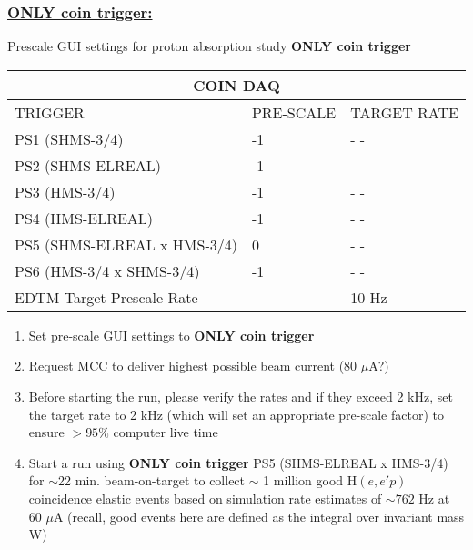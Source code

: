 \documentclass{article}
\begin{document}
\subsubsection*{\underline{ONLY coin trigger:}} 
    \begin{center}
    Prescale GUI settings for proton absorption study \textbf{ONLY coin trigger}
    \begin{tabular}{ |p{6cm}| |p{3cm}| |p{3cm}| }
    \hline
    \multicolumn{3}{|c|}{COIN DAQ} \\
    \hline
    TRIGGER & PRE-SCALE & TARGET RATE\\
    \hline
    PS1 (SHMS-3/4)    & -1  & - - \\
    PS2 (SHMS-ELREAL) &  -1  & - - \\
    PS3 (HMS-3/4)     & -1  & - -\\
    PS4 (HMS-ELREAL)  & -1  & - - \\
    PS5 (SHMS-ELREAL x HMS-3/4)  & 0 & - -  \\
    PS6 (HMS-3/4 x SHMS-3/4)     & -1 & - -  \\
    \hline
    EDTM Target Prescale Rate & - - & 10 Hz \\
    \hline
    \end{tabular}
    \end{center}
\begin{enumerate}
    \item Set pre-scale GUI settings to \textbf{ONLY coin trigger}
    \item Request MCC to deliver highest possible beam current (80 $\mu$A?)
    \item Before starting the run, please verify the rates and if they exceed 2 kHz, set the target rate to 2 kHz (which will set an appropriate pre-scale factor) to ensure $>95\%$ computer live time
    \item Start a run using \textbf{ONLY coin trigger} PS5 (SHMS-ELREAL x HMS-3/4) for $\sim$22 min. beam-on-target to collect $\sim$ 1 million good H$(e,e'p)$ coincidence elastic events based on simulation rate estimates of $\sim762$ Hz at 60 $\mu$A
    (recall, good events here are defined as the integral over invariant mass W)
\end{enumerate}      
    
\end{document}

